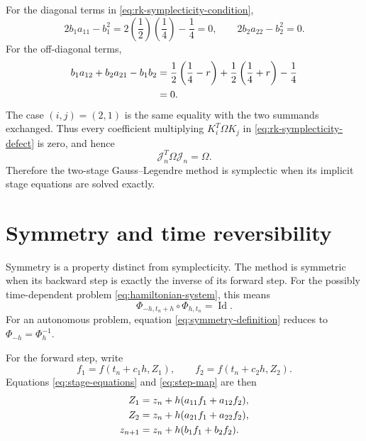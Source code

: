 \documentclass[11pt,a4paper]{article}
\newcommand{\Om}{\Omega}
\newcommand{\Jn}{\mathcal{J}_n}
\begin{document}
For the diagonal terms in \eqref{eq:rk-symplecticity-condition},
\begin{equation}
 2b_1a_{11}-b_1^2
 =2\left(\frac12\right)\left(\frac14\right)-\frac14=0,
 \qquad
 2b_2a_{22}-b_2^2=0.
 \label{eq:diagonal-check}
\end{equation}
For the off-diagonal terms,
\begin{align}
 b_1a_{12}+b_2a_{21}-b_1b_2
 &=\frac12\left(\frac14-r\right)
   +\frac12\left(\frac14+r\right)-\frac14
 \notag\\
 &=0.
 \label{eq:off-diagonal-check}
\end{align}
The case $(i,j)=(2,1)$ is the same equality with the two summands exchanged.
Thus every coefficient multiplying $K_i^T\Om K_j$ in
\eqref{eq:rk-symplecticity-defect} is zero, and hence
\begin{equation}
 \boxed{\Jn^T\Om\Jn=\Om.}
 \label{eq:final-symplecticity}
\end{equation}
Therefore the two-stage Gauss--Legendre method is symplectic when its implicit
stage equations are solved exactly.

\clearpage

\section{Symmetry and time reversibility}

Symmetry is a property distinct from symplecticity.  The method is symmetric
when its backward step is exactly the inverse of its forward step.  For the
possibly time-dependent problem \eqref{eq:hamiltonian-system}, this means
\begin{equation}
 \boxed{
 \Phi_{-h,t_n+h}\circ\Phi_{h,t_n}=\operatorname{Id}.
 }
 \label{eq:symmetry-definition}
\end{equation}
For an autonomous problem, equation \eqref{eq:symmetry-definition} reduces to
$\Phi_{-h}=\Phi_h^{-1}$.

For the forward step, write
\begin{equation}
 f_1=f(t_n+c_1h,Z_1),
 \qquad
 f_2=f(t_n+c_2h,Z_2).
 \label{eq:forward-stage-fields}
\end{equation}
Equations \eqref{eq:stage-equations} and \eqref{eq:step-map} are then
\begin{align}
 Z_1&=z_n+h(a_{11}f_1+a_{12}f_2),
 \notag\\
 Z_2&=z_n+h(a_{21}f_1+a_{22}f_2),
 \label{eq:forward-stages-expanded}
\\
 z_{n+1}&=z_n+h(b_1f_1+b_2f_2).
 \label{eq:forward-output-expanded}
\end{align}
\end{document}
